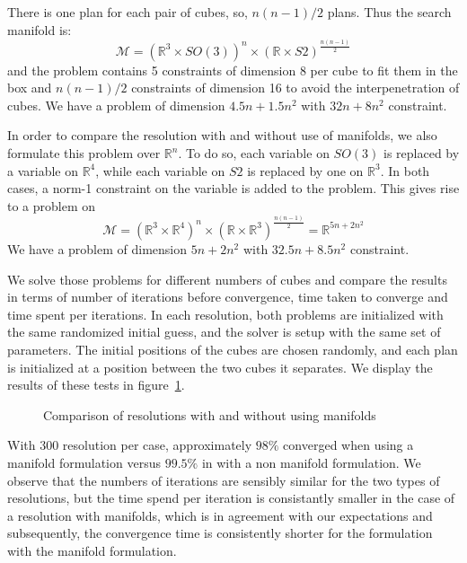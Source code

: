 There is one plan for each pair of cubes, so, $n(n-1)/2$ plans.
Thus the search manifold is:
\begin{equation}
  \mathcal{M} = {\left( \mathbb{R}^3\times SO(3) \right)}^n \times {\left( \mathbb{R} \times S2 \right)}^{\frac{n(n-1)}{2}} \nonumber
\end{equation}
and the problem contains 5 constraints of dimension 8 per cube to fit them in the box and $n(n-1)/2$ constraints of dimension 16 to avoid the interpenetration of cubes.
We have a problem of dimension $4.5n+1.5n^2$ with $32n+8n^2$ constraint.

In order to compare the resolution with and without use of manifolds, we also formulate this problem over $\mathbb{R}^n$.
To do so, each variable on $SO(3)$ is replaced by a variable on $\mathbb{R}^4$, while each variable on $S2$ is replaced by one on $\mathbb{R}^3$.
In both cases, a norm-1 constraint on the variable is added to the problem.
This gives rise to a problem on
\begin{equation}
  \mathcal{M}={\left( \mathbb{R}^3\times \mathbb{R}^4 \right)}^n \times {\left( \mathbb{R} \times \mathbb{R}^3 \right)}^{\frac{n(n-1)}{2}} = \mathbb{R}^{5n+2n^2} \nonumber
\end{equation}
We have a problem of dimension $5n+2n^2$ with $32.5n+8.5n^2$ constraint.

We solve those problems for different numbers of cubes and compare the results in terms of number of iterations before convergence, time taken to converge and time spent per iterations.
In each resolution, both problems are initialized with the same randomized initial guess, and the solver is setup with the same set of parameters.
The initial positions of the cubes are chosen randomly, and each plan is initialized at a position between the two cubes it separates.
We display the results of these tests in figure~\ref{fig:timings-cubes}.

\begin{figure}[htpb]
  \centering
  
  \caption{Comparison of resolutions with and without using manifolds}
\label{fig:timings-cubes}
\end{figure}

With 300 resolution per case, approximately $98\%$ converged when using a manifold formulation versus $99.5\%$ in with a non manifold formulation.
We observe that the numbers of iterations are sensibly similar for the two types of resolutions, but the time spend per iteration is consistantly smaller in the case of a resolution with manifolds, which is in agreement with our expectations and subsequently, the convergence time is consistently shorter for the formulation with the manifold formulation.

